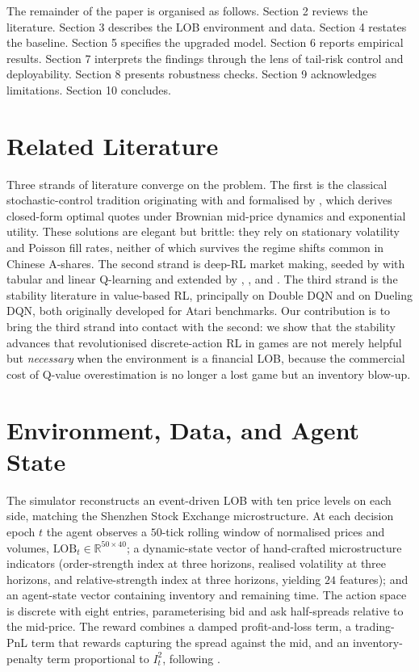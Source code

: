 \documentclass[12pt]{article}
\newcommand{\textcite}[1]{\citet{#1}}
\begin{document}
The remainder of the paper is organised as follows. Section 2 reviews the literature. Section 3 describes the LOB environment and data. Section 4 restates the baseline. Section 5 specifies the upgraded model. Section 6 reports empirical results. Section 7 interprets the findings through the lens of tail-risk control and deployability. Section 8 presents robustness checks. Section 9 acknowledges limitations. Section 10 concludes.

\section{Related Literature}

Three strands of literature converge on the problem. The first is the classical stochastic-control tradition originating with \textcite{Ho1981} and formalised by \textcite{AS2008}, which derives closed-form optimal quotes under Brownian mid-price dynamics and exponential utility. These solutions are elegant but brittle: they rely on stationary volatility and Poisson fill rates, neither of which survives the regime shifts common in Chinese A-shares. The second strand is deep-RL market making, seeded by \textcite{Spooner2018} with tabular and linear Q-learning and extended by \textcite{Gasperov2021}, \textcite{Sadighian2020}, and \textcite{Guo2023}. The third strand is the stability literature in value-based RL, principally \textcite{vanHasselt2016} on Double DQN and \textcite{Wang2016} on Dueling DQN, both originally developed for Atari benchmarks. Our contribution is to bring the third strand into contact with the second: we show that the stability advances that revolutionised discrete-action RL in games are not merely helpful but \emph{necessary} when the environment is a financial LOB, because the commercial cost of Q-value overestimation is no longer a lost game but an inventory blow-up.

\section{Environment, Data, and Agent State}

The simulator reconstructs an event-driven LOB with ten price levels on each side, matching the Shenzhen Stock Exchange microstructure. At each decision epoch $t$ the agent observes a $50$-tick rolling window of normalised prices and volumes, $\text{LOB}_t \in \mathbb{R}^{50 \times 40}$; a dynamic-state vector of hand-crafted microstructure indicators (order-strength index at three horizons, realised volatility at three horizons, and relative-strength index at three horizons, yielding $24$ features); and an agent-state vector containing inventory and remaining time. The action space is discrete with eight entries, parameterising bid and ask half-spreads relative to the mid-price. The reward combines a damped profit-and-loss term, a trading-PnL term that rewards capturing the spread against the mid, and an inventory-penalty term proportional to $I_t^2$, following \textcite{Guo2023}.
\end{document}
